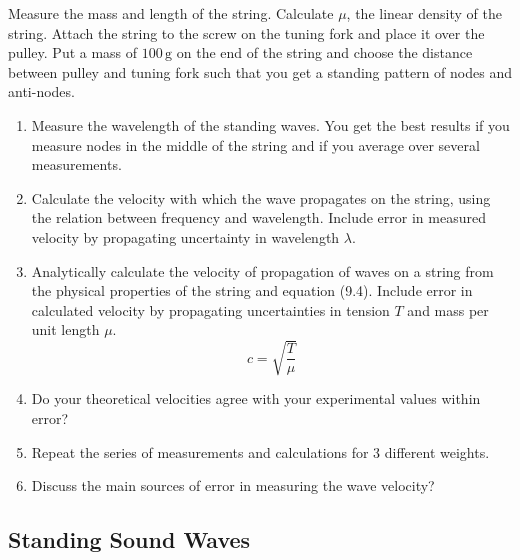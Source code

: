 Measure the mass and length of the string. Calculate $\mu$, the linear density of the string. Attach the string to the screw on the tuning fork and place it over the pulley. Put a mass of $100\, \textrm{g}$ on the end of the string and choose the distance between pulley and tuning fork such that you get a standing pattern of nodes and anti-nodes.
\begin{enumerate}
\item Measure the wavelength of the standing waves. You get the best results if you measure nodes in the middle of the string and if you average over several measurements.
\item Calculate the velocity with which the wave propagates on the string, using the relation between frequency and wavelength. Include error in measured velocity by propagating uncertainty in wavelength $\lambda$.
\item Analytically calculate the velocity of propagation of waves on a string from the physical properties of the string and equation (9.4). Include error in calculated velocity by propagating uncertainties in tension $T$ and mass per unit length $\mu$.
  \begin{equation}
    c=\sqrt{\frac{T}{\mu}}
  \end{equation}

\item Do your theoretical velocities agree with your experimental values within error?
\item Repeat the series of measurements and calculations for 3 different weights.
\item Discuss the main sources of error in measuring the wave velocity?

\end{enumerate}

\subsection{Standing Sound Waves}

